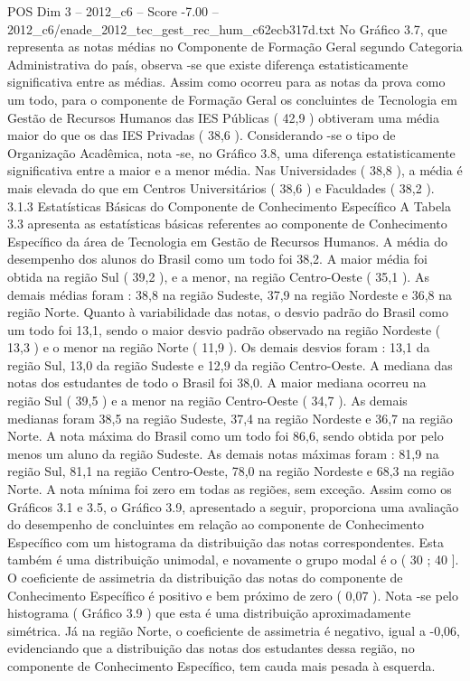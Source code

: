 \begin{textsample}{POS Dim 3 – 2012\_c6 – Score -7.00 – 2012\_c6/enade\_2012\_tec\_gest\_rec\_hum\_c62ecb317d.txt}
No Gráfico 3.7, que representa as notas médias no Componente de Formação Geral segundo Categoria Administrativa do país, observa -se que existe diferença estatisticamente significativa entre as médias.
Assim como ocorreu para as notas da prova como um todo, para o componente de Formação Geral os concluintes de Tecnologia em Gestão de Recursos Humanos das IES Públicas ( 42,9 ) obtiveram uma média maior do que os das IES Privadas ( 38,6 ).
Considerando -se o tipo de Organização Acadêmica, nota -se, no Gráfico 3.8, uma diferença estatisticamente significativa entre a maior e a menor média.
Nas Universidades ( 38,8 ), a média é mais elevada do que em Centros Universitários ( 38,6 ) e Faculdades ( 38,2 ). 3.1.3 Estatísticas Básicas do Componente de Conhecimento Específico A Tabela 3.3 apresenta as estatísticas básicas referentes ao componente de Conhecimento Específico da área de Tecnologia em Gestão de Recursos Humanos.
A média do desempenho dos alunos do Brasil como um todo foi 38,2.
A maior média foi obtida na região Sul ( 39,2 ), e a menor, na região Centro-Oeste ( 35,1 ).
As demais médias foram : 38,8 na região Sudeste, 37,9 na região Nordeste e 36,8 na região Norte.
Quanto à variabilidade das notas, o desvio padrão do Brasil como um todo foi 13,1, sendo o maior desvio padrão observado na região Nordeste ( 13,3 ) e o menor na região Norte ( 11,9 ).
Os demais desvios foram : 13,1 da região Sul, 13,0 da região Sudeste e 12,9 da região Centro-Oeste.
A mediana das notas dos estudantes de todo o Brasil foi 38,0.
A maior mediana ocorreu na região Sul ( 39,5 ) e a menor na região Centro-Oeste ( 34,7 ).
As demais medianas foram 38,5 na região Sudeste, 37,4 na região Nordeste e 36,7 na região Norte.
A nota máxima do Brasil como um todo foi 86,6, sendo obtida por pelo menos um aluno da região Sudeste.
As demais notas máximas foram : 81,9 na região Sul, 81,1 na região Centro-Oeste, 78,0 na região Nordeste e 68,3 na região Norte.
A nota mínima foi zero em todas as regiões, sem exceção.
Assim como os Gráficos 3.1 e 3.5, o Gráfico 3.9, apresentado a seguir, proporciona uma avaliação do desempenho de concluintes em relação ao componente de Conhecimento Específico com um histograma da distribuição das notas correspondentes.
Esta também é uma distribuição unimodal, e novamente o grupo modal é o ( 30 ; 40 ].
O coeficiente de assimetria da distribuição das notas do componente de Conhecimento Específico é positivo e bem próximo de zero ( 0,07 ).
Nota -se pelo histograma ( Gráfico 3.9 ) que esta é uma distribuição aproximadamente simétrica.
Já na região Norte, o coeficiente de assimetria é negativo, igual a -0,06, evidenciando que a distribuição das notas dos estudantes dessa região, no componente de Conhecimento Específico, tem cauda mais pesada à esquerda.

\end{textsample}
